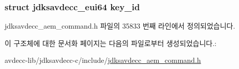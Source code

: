 \subsubsection[{\texorpdfstring{key\+\_\+id}{key_id}}]{\setlength{\rightskip}{0pt plus 5cm}struct {\bf jdksavdecc\+\_\+eui64} key\+\_\+id}\hypertarget{structjdksavdecc__aem__command__auth__delete__key__response_a37cbdf6056556ccfaee3ab01dc7c3032}{}\label{structjdksavdecc__aem__command__auth__delete__key__response_a37cbdf6056556ccfaee3ab01dc7c3032}


jdksavdecc\+\_\+aem\+\_\+command.\+h 파일의 35833 번째 라인에서 정의되었습니다.



이 구조체에 대한 문서화 페이지는 다음의 파일로부터 생성되었습니다.\+:\begin{DoxyCompactItemize}
\item 
avdecc-\/lib/jdksavdecc-\/c/include/\hyperlink{jdksavdecc__aem__command_8h}{jdksavdecc\+\_\+aem\+\_\+command.\+h}\end{DoxyCompactItemize}
